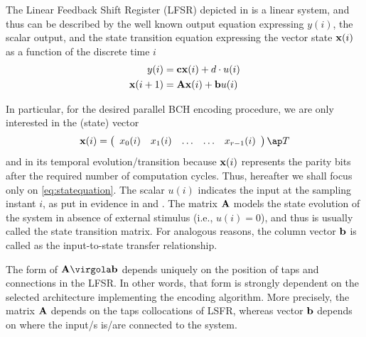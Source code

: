 The Linear Feedback Shift Register (LFSR) depicted in  is a linear system, and thus can be described by the well known output equation expressing \( y(i)\), the scalar output, and the state transition equation expressing the vector state \(\mathbf{x}(i)\) as a function of the discrete time \(i\)
\begin{subequations} \label{eq:LFSR}
\begin{align}
 y(i) & = \mathbf{cx}(i) + d\cdot u(i) \\
\mathbf{x}(i+1) &= \mathbf{Ax}(i) + \mathbf{b}u(i) \label{eq:statequation}
\end{align}
\end{subequations}

In particular, for the desired parallel BCH encoding procedure, we are only interested in the (state) vector
\begin{equation}
\vet x(i) =
\left(
\begin{array}{ccccc}
  x_0(i)   & x_1(i) & \ldots  & \ldots & x_{r-1}(i) \\
\end{array}
\right)\ap T
\end{equation}
and in its temporal evolution/transition because \(\mathbf{x}(i)\) represents the parity bits after the required number of computation cycles. Thus, hereafter we shall focus only on \eqref{eq:statequation}. The scalar $u(i)$ indicates the input at the sampling instant $i$, as put in evidence in  and . The matrix \(\mathbf{A}\) models the state evolution of the system in absence of external stimulus (i.e., \(u(i)=0\)), and thus is usually called the state transition matrix. For analogous reasons, the column vector $\mathbf{b}$ is called as the input-to-state transfer relationship. %

The form of \(\vet A \virgola \vet b\) depends uniquely on the position of taps and connections in the LFSR. In other words, that form is strongly dependent on the selected architecture implementing the encoding algorithm. More precisely, the matrix $\mathbf{A}$ depends on the taps collocations of LSFR, whereas vector $\mathbf{b}$ depends on where the input/s is/are connected to the system.

